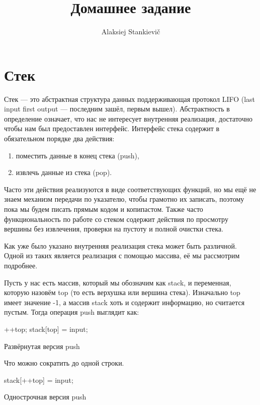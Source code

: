 \documentclass[12pt]{article}
\author{Alaksiej Stankievič}
\title{Домашнее задание}
\begin{document}

\section{Стек}
Стек --- это абстрактная структура данных поддерживающая протокол LIFO (last input first output --- последним зашёл, первым вышел). Абстрактность в определение означает, что нас не интересует внутренняя реализация, достаточно чтобы нам был предоставлен интерфейс. Интерфейс стека содержит в обязательном порядке два действия:
\begin{enumerate}
 \item поместить данные в конец стека (push),
 \item извлечь данные из стека (pop).
\end{enumerate}
Часто эти действия реализуются в виде соответствующих функций, но мы ещё не знаем механизм передачи по указателю, чтобы грамотно их записать, поэтому пока мы будем писать прямым кодом и копипастом. Также часто функциональность по работе со стеком содержит действия по просмотру вершины без извлечения, проверки на пустоту и полной очистки стека.

Как уже было указано внутренняя реализация стека может быть различной. Одной из таких является реализация с помощью массива, её мы рассмотрим подробнее.

Пусть у нас есть массив, который мы обозначим как stack, и переменная, которую назовём top (то есть верхушка или вершина стека). Изначально top имеет значение -1, а массив stack хоть и содержит информацию, но считается пустым.
Тогда операция push выглядит как:
\begin{listing}[H]
\begin{center}
\begin{ccode}
++top;
stack[top] = input;
\end{ccode}
\end{center}
\caption{Развёрнутая версия push}
\label{lst:pushext}
\end{listing}
Что можно сократить до одной строки. 
\begin{listing}[H]
\begin{center}
\begin{ccode}
stack[++top] = input;
\end{ccode}
\end{center}
\caption{Однострочная версия push}
\label{lst:pushsingle}
\end{listing}
\end{document}
